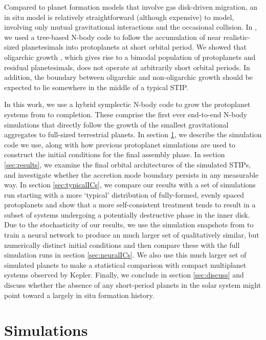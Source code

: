 Compared to planet formation models that involve gas disk-driven migration, an in situ model is relatively straightforward 
(although expensive) to model, involving only mutual gravitational interactions and the occasional collision. In \cite{wallace23},
we used a tree-based N-body code to follow the accumulation of near realistic-sized planetesimals 
into protoplanets at short orbital period. We showed that oligarchic growth \cite{kokubo98}, which gives rise to a bimodal 
population of protoplanets and residual planetesimals, does not operate at arbitrarily short orbital periods. In addition, the 
boundary between oligarchic and non-oligarchic growth should be expected to lie somewhere in the middle of a typical STIP.

In this work, we use a hybrid symplectic N-body code to grow the protoplanet systems from \cite{wallace23} to completion. These 
comprise the first ever end-to-end N-body simulations that directly follow the growth of the 
smallest gravitational aggregates to full-sized terrestrial planets. In section \ref{sec:simulations}, we describe the simulation code 
we use, along with how previous protoplanet simulations are used to construct the initial conditions for the final assembly phase. In 
section \ref{sec:results}, we examine the final orbital architectures of the simulated STIPs, and investigate whether the accretion 
mode boundary persists in any measurable way. In section \ref{sec:typicalICs}, we compare our results with a set of simulations 
run starting with a more `typical' distribution of fully-formed, evenly spaced protoplanets and show that a more self-consistent 
treatment tends to result in a subset of systems undergoing a potentially destructive phase in the inner disk. Due to the 
stochasticity of our results, we use the simulation snapshots from \cite{wallace23} to train a neural 
network to produce an much larger set of qualitatively similar, but numerically distinct initial conditions and then compare these with the 
full simulation runs in section \ref{sec:neuralICs}. We also use this much larger set of simulated planets to make a statistical 
comparison with compact multiplanet systems observed by Kepler. Finally, we conclude in section \ref{sec:discuss} and discuss 
whether the absence of any short-period planets in the solar system might point toward a largely in situ formation history.

\section{Simulations} \label{sec:simulations}

